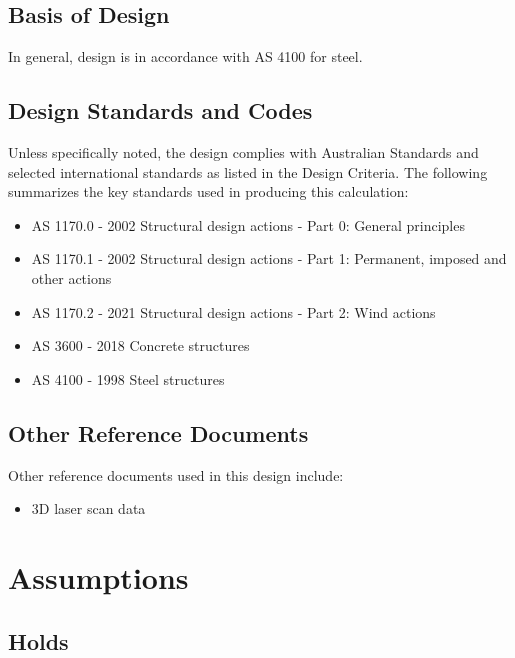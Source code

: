 \documentclass[
  11pt,
  letterpaper,
  DIV=11,
  numbers=noendperiod]{scrartcl}
\providecommand{\tightlist}{%
  \setlength{\itemsep}{0pt}\setlength{\parskip}{0pt}}
\begin{document}
\subsection{Basis of Design}\label{basis-of-design}

In general, design is in accordance with AS 4100 for steel.

\subsection{Design Standards and
Codes}\label{design-standards-and-codes}

Unless specifically noted, the design complies with Australian Standards
and selected international standards as listed in the Design Criteria.
The following summarizes the key standards used in producing this
calculation:

\begin{itemize}
\tightlist
\item
  AS 1170.0 - 2002 Structural design actions - Part 0: General
  principles
\item
  AS 1170.1 - 2002 Structural design actions - Part 1: Permanent,
  imposed and other actions
\item
  AS 1170.2 - 2021 Structural design actions - Part 2: Wind actions
\item
  AS 3600 - 2018 Concrete structures
\item
  AS 4100 - 1998 Steel structures
\end{itemize}

\subsection{Other Reference Documents}\label{other-reference-documents}

Other reference documents used in this design include:

\begin{itemize}
\tightlist
\item
  3D laser scan data
\end{itemize}

\newpage{}

\section{Assumptions}\label{assumptions}

\subsection{Holds}\label{holds}
\end{document}
